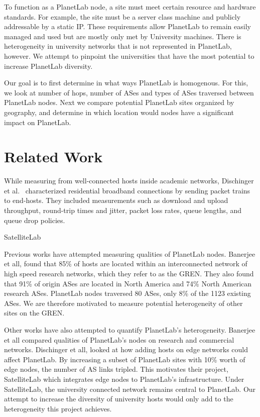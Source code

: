 \documentclass{sig-alternate-10pt}
\begin{document}
To function as a PlanetLab node, a site must meet certain resource and hardware
standards. For example, the site must be a server class machine and publicly
addressable by a static IP. These requirements allow PlanetLab to remain easily
managed and used but are mostly only met by University machines. There is
heterogeneity in university networks that is not represented in PlanetLab,
however. We attempt to pinpoint the universities that have the most potential
to increase PlanetLab diversity.  

Our goal is to first determine in what ways PlanetLab is homogenous. For this,
we look at number of hops, number of ASes and types of ASes traversed between
PlanetLab nodes. Next we compare potential PlanetLab sites organized by
geography, and determine in which location would nodes have a significant
impact on PlanetLab. 


\section{Related Work} 

While measuring from well-connected hosts inside academic networks, Dischinger
et al.~\cite{dischinger:residential} characterized residential broadband
connections by sending packet trains to end-hosts. They included measurements
such as download and upload throughput, round-trip times and jitter, packet
loss rates, queue lengths, and queue drop policies. 

SatelliteLab~\cite{dischinger:satellitelab} 

Previous works have attempted measuring qualities of PlanetLab nodes. Banerjee
et all, found that 85\% of hosts are located within an interconnected network of
high speed research networks, which they refer to as the GREN. They also found
that 91\% of origin ASes are located in North America and 74\% North American
research ASes. PlanetLab nodes traversed 80 ASes, only 8\% of the 1123 existing
ASes. We are therefore motivated to measure potential heterogeneity of other
sites on the GREN.

Other works have also attempted to quantify PlanetLab’s heterogeneity. Banerjee
et all compared qualities of PlanetLab’s nodes on research and commercial
networks. Dischinger et all, looked at how adding hosts on edge networks could
affect PlanetLab. By increasing a subset of PlanetLab sites with 10\% worth of
edge nodes, the number of AS links tripled. This motivates their project,
SatelliteLab which integrates edge nodes to PlanetLab’s infrastructure. Under
SatelliteLab, the university connected network remains central to PlanetLab.
Our attempt to increase the diversity of university hosts would only add to the
heterogeneity this project achieves.
\end{document}

